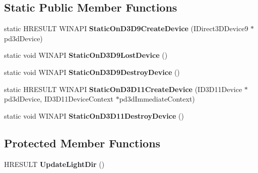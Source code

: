 \subsection*{Static Public Member Functions}
\begin{DoxyCompactItemize}
\item 
\hypertarget{class_c_d_x_u_t_direction_widget_a218b1161c55e7427e85665a14f286799}{static H\+R\+E\+S\+U\+L\+T W\+I\+N\+A\+P\+I {\bfseries Static\+On\+D3\+D9\+Create\+Device} (I\+Direct3\+D\+Device9 $\ast$pd3d\+Device)}\label{class_c_d_x_u_t_direction_widget_a218b1161c55e7427e85665a14f286799}

\item 
\hypertarget{class_c_d_x_u_t_direction_widget_a556a5e11a885f36be67ba2b082490451}{static void W\+I\+N\+A\+P\+I {\bfseries Static\+On\+D3\+D9\+Lost\+Device} ()}\label{class_c_d_x_u_t_direction_widget_a556a5e11a885f36be67ba2b082490451}

\item 
\hypertarget{class_c_d_x_u_t_direction_widget_a552783ed575f96985f2f7530d9757b98}{static void W\+I\+N\+A\+P\+I {\bfseries Static\+On\+D3\+D9\+Destroy\+Device} ()}\label{class_c_d_x_u_t_direction_widget_a552783ed575f96985f2f7530d9757b98}

\item 
\hypertarget{class_c_d_x_u_t_direction_widget_ab75566d9ddba49de7142d2cc953fe6a9}{static H\+R\+E\+S\+U\+L\+T W\+I\+N\+A\+P\+I {\bfseries Static\+On\+D3\+D11\+Create\+Device} (I\+D3\+D11\+Device $\ast$pd3d\+Device, I\+D3\+D11\+Device\+Context $\ast$pd3d\+Immediate\+Context)}\label{class_c_d_x_u_t_direction_widget_ab75566d9ddba49de7142d2cc953fe6a9}

\item 
\hypertarget{class_c_d_x_u_t_direction_widget_a7d63eba98a20b97b66442b97a43a1c8d}{static void W\+I\+N\+A\+P\+I {\bfseries Static\+On\+D3\+D11\+Destroy\+Device} ()}\label{class_c_d_x_u_t_direction_widget_a7d63eba98a20b97b66442b97a43a1c8d}

\end{DoxyCompactItemize}
\subsection*{Protected Member Functions}
\begin{DoxyCompactItemize}
\item 
\hypertarget{class_c_d_x_u_t_direction_widget_a35dd2b18e3169755c5d13cb4b8da8ec6}{H\+R\+E\+S\+U\+L\+T {\bfseries Update\+Light\+Dir} ()}\label{class_c_d_x_u_t_direction_widget_a35dd2b18e3169755c5d13cb4b8da8ec6}

\end{DoxyCompactItemize}
